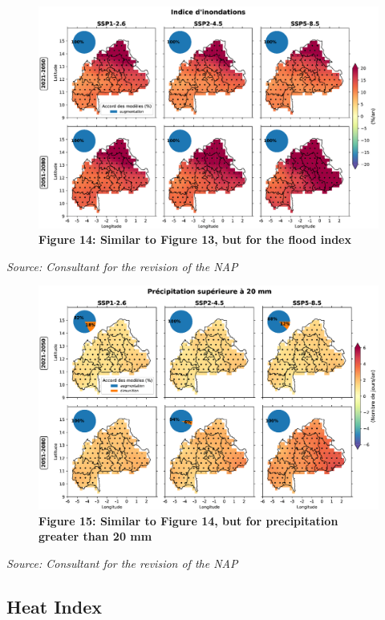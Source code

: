 \documentclass[
]{book}
\begin{document}
\begin{figure}
\centering
\includegraphics{Figures and Photos/Figure 14.png}
\caption{\textbf{Figure 14: Similar to Figure 13, but for the flood index}}
\end{figure}

\emph{Source: Consultant for the revision of the NAP}

\begin{figure}
\centering
\includegraphics{Figures and Photos/Figure 15.png}
\caption{\textbf{Figure 15: Similar to Figure 14, but for precipitation greater than 20 mm}}
\end{figure}

\emph{Source: Consultant for the revision of the NAP}

\subsection{Heat Index}\label{heat-index}
\end{document}
